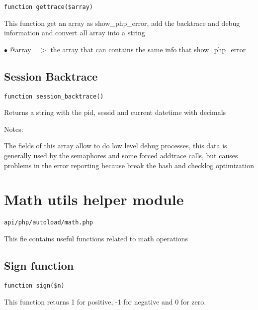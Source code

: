\documentclass[a4paper]{book}
\begin{document}
\begin{lstlisting}
function gettrace($array)
\end{lstlisting}

This function get an array as show\_php\_error, add the backtrace and debug
information and convert all array into a string

\begin{compactitem}
\item[\color{myblue}$\bullet$] @array =$>$ the array that can contains the same info that show\_php\_error
\end{compactitem}

\hypertarget{toc199}{}
\subsection{Session Backtrace}

\begin{lstlisting}
function session_backtrace()
\end{lstlisting}

Returns a string with the pid, sessid and current datetime with decimals

Notes:

The fields of this array allow to do low level debug processes, this data is
generally used by the semaphores and some forced addtrace calls, but causes
problems in the error reporting because break the hash and checklog optimization

\hypertarget{toc200}{}
\section{Math utils helper module}

\begin{lstlisting}
api/php/autoload/math.php
\end{lstlisting}

This fie contains useful functions related to math operations

\hypertarget{toc201}{}
\subsection{Sign function}

\begin{lstlisting}
function sign($n)
\end{lstlisting}

This function returns 1 for positive, -1 for negative and 0 for zero.
\end{document}
